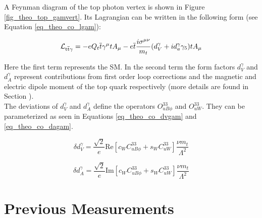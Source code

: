 A Feynman diagram of the top photon vertex is shown in Figure \ref{fig_theo_top_gamvert}. Its Lagrangian can be written in the following form (see Equation \ref{eq_theo_co_lgam}):

\begin{equation}
  \mathcal{L}_{\mathrm{t}\overline{\mathrm{t}} \gamma} = -e Q_t \overline{t} \gamma^{\mu} t A_{\mu} - e \overline{t} \frac{i \sigma^{\mu \nu}}{m_t} (d_V^{\gamma} + i d_a^{\gamma} \gamma_5) t A_{\mu}
  \label{eq_theo_co_lgam}
  \end{equation}

Here the first term represents the SM. In the second term the form factors $d_V^{\gamma}$ and $d_A^{\gamma}$ represent contributions from first order loop corrections and the magnetic and electric dipole moment of the top quark respectively (more details are found in Section ). \\
The deviations of $d_V^{\gamma}$ and $d_A^{\gamma}$ define the operators $O_{uB\phi}^{33}$ and $O_{uW}^{33}$. They can be parameterized as seen in Equations \ref{eq_theo_co_dvgam} and \ref{eq_theo_co_dagam}. 

\begin{equation}
\delta d_V^{\gamma} = \frac{\sqrt{2}}{e} \mathrm{Re} \left[ c_W C_{uB\phi}^{33} + s_W C_{uW}^{33} \right] \frac{\nu m_t}{\Lambda^2} 
\label{eq_theo_co_dvgam}
\end{equation}

\begin{equation}
\delta d_A^{\gamma} = \frac{\sqrt{2}}{e} \mathrm{Im} \left[ c_W C_{uB\phi}^{33} + s_W C_{uW}^{33} \right] \frac{\nu m_t}{\Lambda^2} 
\label{eq_theo_co_dagam}
\end{equation}

\section{Previous Measurements}

